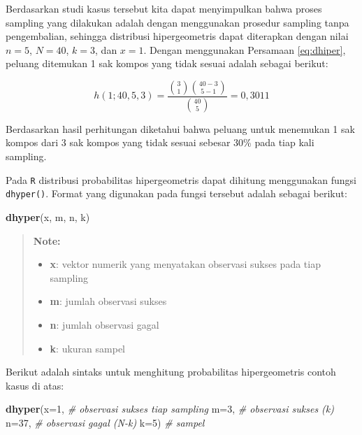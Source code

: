 \documentclass[]{book}
\newenvironment{Shaded}{\begin{snugshade}}{\end{snugshade}}
\newcommand{\KeywordTok}[1]{\textcolor[rgb]{0.13,0.29,0.53}{\textbf{#1}}}
\newcommand{\DataTypeTok}[1]{\textcolor[rgb]{0.13,0.29,0.53}{#1}}
\newcommand{\DecValTok}[1]{\textcolor[rgb]{0.00,0.00,0.81}{#1}}
\newcommand{\CommentTok}[1]{\textcolor[rgb]{0.56,0.35,0.01}{\textit{#1}}}
\newcommand{\NormalTok}[1]{#1}
\providecommand{\tightlist}{%
  \setlength{\itemsep}{0pt}\setlength{\parskip}{0pt}}
\begin{document}
Berdasarkan studi kasus tersebut kita dapat menyimpulkan bahwa proses
sampling yang dilakukan adalah dengan menggunakan prosedur sampling
tanpa pengembalian, sehingga distribusi hipergeometris dapat diterapkan
dengan nilai \(n=5\), \(N=40\), \(k=3\), dan \(x=1\). Dengan menggunakan
Persamaan \eqref{eq:dhiper}, peluang ditemukan 1 sak kompos yang tidak
sesuai adalah sebagai berikut:

\[
h\left(1;40,5,3\right)=\frac{\binom{3}{1}\binom{40-3}{5-1}}{\binom{40}{5}}=0,3011
\]

Berdasarkan hasil perhitungan diketahui bahwa peluang untuk menemukan 1
sak kompos dari 3 sak kompos yang tidak sesuai sebesar 30\% pada tiap
kali sampling.

Pada \texttt{R} distribusi probabilitas hipergeometris dapat dihitung
menggunakan fungsi \texttt{dhyper()}. Format yang digunakan pada fungsi
tersebut adalah sebagai berikut:

\begin{Shaded}
\begin{Highlighting}[]
\KeywordTok{dhyper}\NormalTok{(x, m, n, k)}
\end{Highlighting}
\end{Shaded}

\begin{quote}
\textbf{Note: }

\begin{itemize}
\tightlist
\item
  \textbf{x}: vektor numerik yang menyatakan observasi sukses pada tiap
  sampling
\item
  \textbf{m}: jumlah observasi sukses
\item
  \textbf{n}: jumlah observasi gagal
\item
  \textbf{k}: ukuran sampel
\end{itemize}
\end{quote}

Berikut adalah sintaks untuk menghitung probabilitas hipergeometris
contoh kasus di atas:

\begin{Shaded}
\begin{Highlighting}[]
\KeywordTok{dhyper}\NormalTok{(}\DataTypeTok{x=}\DecValTok{1}\NormalTok{, }\CommentTok{# observasi sukses tiap sampling}
       \DataTypeTok{m=}\DecValTok{3}\NormalTok{, }\CommentTok{# observasi sukses (k)}
       \DataTypeTok{n=}\DecValTok{37}\NormalTok{, }\CommentTok{# observasi gagal (N-k)}
       \DataTypeTok{k=}\DecValTok{5}\NormalTok{) }\CommentTok{# sampel}
\end{Highlighting}
\end{Shaded}
\end{document}
